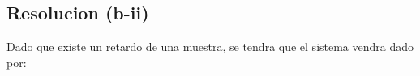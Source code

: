 \documentclass[
  11pt,
  letterpaper,
   addpoints,
   answers
  ]{exam}
\begin{document}
\begin{questions}
\begin{solution}
\subsection*{Resolucion (b-ii)}
Dado que existe un retardo de una muestra, se tendra que el sistema vendra dado por:
\end{solution}


\end{questions}
\newpage
\end{document}
